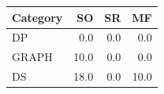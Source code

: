 \begin{tabular}{@{}lrrr@{}}
\toprule
Category & SO & SR & MF \\
\midrule
DP & 0.0 & 0.0 & 0.0 \\
GRAPH & 10.0 & 0.0 & 0.0 \\
DS & 18.0 & 0.0 & 10.0 \\
\bottomrule
\end{tabular}

